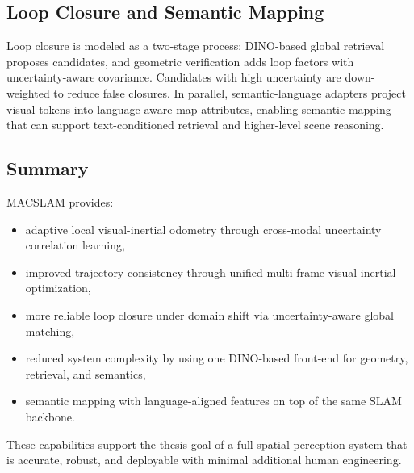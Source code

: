 \subsection{Loop Closure and Semantic Mapping}

Loop closure is modeled as a two-stage process: DINO-based global retrieval proposes candidates, and geometric verification adds loop factors with uncertainty-aware covariance.
Candidates with high uncertainty are down-weighted to reduce false closures.
In parallel, semantic-language adapters project visual tokens into language-aware map attributes, enabling semantic mapping that can support text-conditioned retrieval and higher-level scene reasoning.

\subsection{Summary}

MACSLAM provides:
\begin{itemize}
    \item adaptive local visual-inertial odometry through cross-modal uncertainty correlation learning,
    \item improved trajectory consistency through unified multi-frame visual-inertial optimization,
    \item more reliable loop closure under domain shift via uncertainty-aware global matching,
    \item reduced system complexity by using one DINO-based front-end for geometry, retrieval, and semantics,
    \item semantic mapping with language-aligned features on top of the same SLAM backbone.
\end{itemize}
These capabilities support the thesis goal of a full spatial perception system that is accurate, robust, and deployable with minimal additional human engineering.